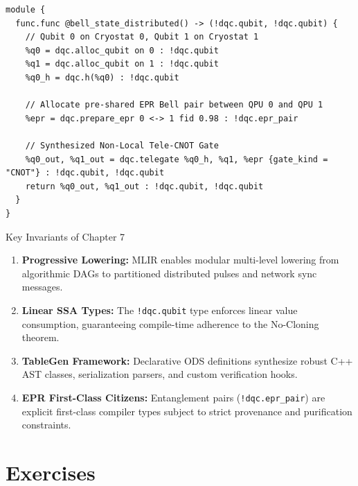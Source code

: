 \begin{lstlisting}[language=MLIR, caption={Partitioned Distributed DQC IR after Pass 2 \& 3}]
module {
  func.func @bell_state_distributed() -> (!dqc.qubit, !dqc.qubit) {
    // Qubit 0 on Cryostat 0, Qubit 1 on Cryostat 1
    %q0 = dqc.alloc_qubit on 0 : !dqc.qubit
    %q1 = dqc.alloc_qubit on 1 : !dqc.qubit
    %q0_h = dqc.h(%q0) : !dqc.qubit
    
    // Allocate pre-shared EPR Bell pair between QPU 0 and QPU 1
    %epr = dqc.prepare_epr 0 <-> 1 fid 0.98 : !dqc.epr_pair
    
    // Synthesized Non-Local Tele-CNOT Gate
    %q0_out, %q1_out = dqc.telegate %q0_h, %q1, %epr {gate_kind = "CNOT"} : !dqc.qubit, !dqc.qubit
    return %q0_out, %q1_out : !dqc.qubit, !dqc.qubit
  }
}
\end{lstlisting}


\begin{summarybox}{Key Invariants of Chapter 7}
\begin{enumerate}
    \item \textbf{Progressive Lowering:} MLIR enables modular multi-level lowering from algorithmic DAGs to partitioned distributed pulses and network sync messages.
    \item \textbf{Linear SSA Types:} The \texttt{!dqc.qubit} type enforces linear value consumption, guaranteeing compile-time adherence to the No-Cloning theorem.
    \item \textbf{TableGen Framework:} Declarative ODS definitions synthesize robust C++ AST classes, serialization parsers, and custom verification hooks.
    \item \textbf{EPR First-Class Citizens:} Entanglement pairs (\texttt{!dqc.epr\_pair}) are explicit first-class compiler types subject to strict provenance and purification constraints.
\end{enumerate}
\end{summarybox}


\section*{Exercises}

